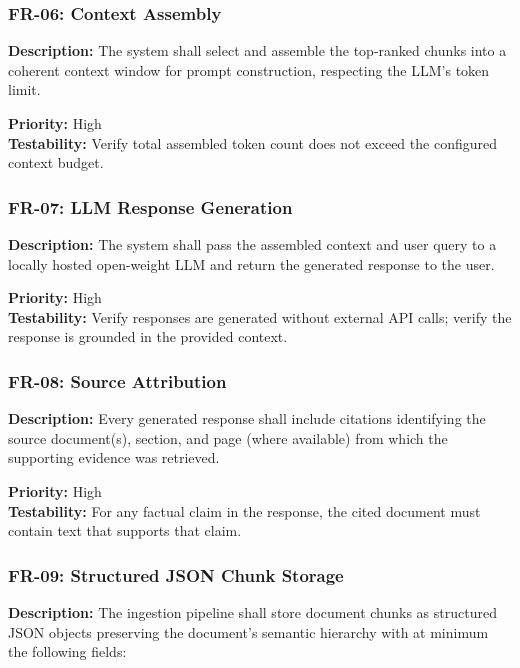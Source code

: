 \documentclass[
  11pt,
]{article}
\begin{document}
\subsubsection{FR-06: Context Assembly}\label{fr-06-context-assembly}

\textbf{Description:} The system shall select and assemble the
top-ranked chunks into a coherent context window for prompt
construction, respecting the LLM's token limit.

\textbf{Priority:} High\\
\textbf{Testability:} Verify total assembled token count does not exceed
the configured context budget.

\subsubsection{FR-07: LLM Response
Generation}\label{fr-07-llm-response-generation}

\textbf{Description:} The system shall pass the assembled context and
user query to a locally hosted open-weight LLM and return the generated
response to the user.

\textbf{Priority:} High\\
\textbf{Testability:} Verify responses are generated without external
API calls; verify the response is grounded in the provided context.

\subsubsection{FR-08: Source
Attribution}\label{fr-08-source-attribution}

\textbf{Description:} Every generated response shall include citations
identifying the source document(s), section, and page (where available)
from which the supporting evidence was retrieved.

\textbf{Priority:} High\\
\textbf{Testability:} For any factual claim in the response, the cited
document must contain text that supports that claim.

\subsubsection{FR-09: Structured JSON Chunk
Storage}\label{fr-09-structured-json-chunk-storage}

\textbf{Description:} The ingestion pipeline shall store document chunks
as structured JSON objects preserving the document's semantic hierarchy
with at minimum the following fields:
\end{document}
